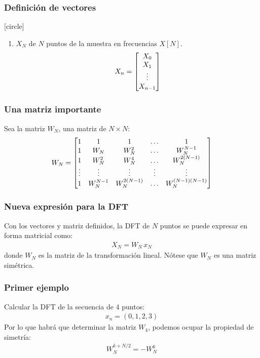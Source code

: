 \documentclass[12pt]{beamer}
\begin{document}
\begin{frame}
\frametitle{Definición de vectores}
[circle]
\begin{enumerate}[<+->]
\conti    
\item $X_{N}$ de $N$ puntos de la muestra en frecuencias $X[N]$.
\begin{align*}
X_{n} = \mqty[
X_{0} \\
X_{1} \\
\vdots \\
X_{n-1} \\
]
\end{align*}
\end{enumerate}
\end{frame}
\begin{frame}
\frametitle{Una matriz importante}
Sea la matriz $W_{N}$, una matriz de $N \times N$:
\begin{align*}
W_{N} =
\mqty[
1 & 1 & 1 & \ldots & 1 \\
1 & W_{N} & W_{N}^{2} & \ldots & W_{N}^{N-1} \\
1 & W_{N}^{2} & W_{N}^{4} & \ldots & W_{N}^{2(N-1)} \\
\vdots & \vdots & \vdots & \vdots & \vdots \\
1 & W_{N}^{N-1} & W_{N}^{2(N-1)} & \ldots & W_{N}^{(N-1)(N-1)} \\
]
\end{align*}
\end{frame}
\begin{frame}
\frametitle{Nueva expresión para la DFT}
Con los vectores y matriz definidos, la DFT de $N$ puntos se puede expresar en forma matricial como:
\begin{align*}
X_{N} = W_{N} \, x_{N}
\end{align*}
donde $W_{N}$ es la matriz de la transformación lineal. Nótese que $W_{N}$ es una matriz simétrica.
\end{frame}
\begin{frame}
\frametitle{Primer ejemplo}
Calcular la DFT de la secuencia de $4$ puntos:
\begin{align*}
x_{n} = (0, 1, 2, 3)
\end{align*}
\pause
Por lo que habrá que determinar la matriz $W_{4}$, podemos ocupar la propiedad de simetría:
\pause
\begin{align*}
W_{N}^{k + N / 2} = - W_{N}^{k}
\end{align*}
\end{frame}
\end{document}
